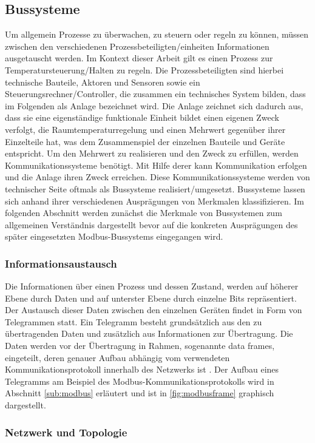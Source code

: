 \subsection{Bussysteme} 
Um allgemein Prozesse zu überwachen, zu steuern oder regeln zu können, müssen zwischen den verschiedenen Prozessbeteiligten/einheiten Informationen ausgetauscht werden. Im Kontext dieser Arbeit gilt es einen Prozess zur Temperatursteuerung/Halten zu regeln. Die Prozessbeteiligten sind hierbei technische Bauteile, Aktoren und Sensoren sowie ein Steuerungsrechner/Controller, die zusammen ein technisches System bilden, dass im Folgenden als Anlage bezeichnet wird. Die Anlage zeichnet sich dadurch aus, dass sie eine eigenständige funktionale Einheit bildet einen eigenen Zweck verfolgt, die Raumtemperaturregelung und einen Mehrwert gegenüber ihrer Einzelteile hat, was dem Zusammenspiel der einzelnen Bauteile und Geräte entspricht. 
Um den Mehrwert zu realisieren und den Zweck zu erfüllen, werden Kommunikationssysteme benötigt. Mit Hilfe derer kann Kommunikation erfolgen und die Anlage ihren Zweck erreichen.
Diese Kommunikationssysteme werden von technischer Seite oftmals als Bussysteme realisiert/umgesetzt.
Bussysteme lassen sich anhand ihrer verschiedenen Ausprägungen von Merkmalen klassifizieren. Im folgenden Abschnitt werden zunächst die Merkmale von Bussystemen zum allgemeinen Verständnis dargestellt bevor auf die konkreten Ausprägungen des später eingesetzten Modbus-Bussystems eingegangen wird.

\subsubsection{Informationsaustausch}

Die Informationen über einen Prozess und dessen Zustand, werden auf höherer Ebene durch Daten und auf unterster Ebene durch einzelne Bits repräsentiert. Der Austausch dieser Daten zwischen den einzelnen Geräten findet in Form von Telegrammen statt. Ein Telegramm besteht grundsätzlich aus den zu übertragenden Daten und zusätzlich aus Informationen zur Übertragung. Die Daten werden vor der Übertragung in Rahmen, sogenannte data frames, eingeteilt, deren genauer Aufbau abhängig vom verwendeten Kommunikationsprotokoll innerhalb des Netzwerks ist \cite[S.~11f.]{schn06}. Der Aufbau eines Telegramms am Beispiel des Modbus-Kommunikationsprotokolls wird in Abschnitt \ref{sub:modbus} erläutert und ist in \ref{fig:modbusframe} graphisch dargestellt.

\subsubsection{Netzwerk und Topologie}

